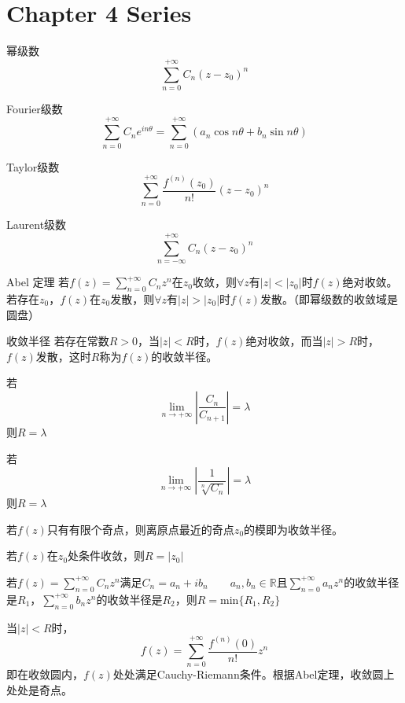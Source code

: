 \section{Chapter 4 Series}
\begin{definition*}{幂级数}
    \[\sum_{n=0}^{+\infty}C_n(z-z_0)^n\]
\end{definition*}
\begin{definition*}{Fourier级数}
    \[\sum_{n=0}^{+\infty}C_ne^{in\theta} = \sum_{n=0}^{+\infty}(a_n\cos n\theta + b_n\sin n\theta)\]
\end{definition*}
\begin{definition*}{Taylor级数}
    \[\sum_{n=0}^{+\infty}\frac{f^{(n)}(z_0)}{n!}(z-z_0)^n\]
\end{definition*}
\begin{definition*}{Laurent级数}
    \[\sum_{n=-\infty}^{+\infty}C_n(z-z_0)^n\]
\end{definition*}
\begin{theorem*}{Abel 定理}
    若$f(z)=\sum_{n=0}^{+\infty}C_nz^n$在$z_0$收敛，则$\forall z$有$|z|<|z_0|$时$f(z)$绝对收敛。
    若存在$z_0$，$f(z)$在$z_0$发散，则$\forall z$有$|z|>|z_0|$时$f(z)$发散。（即幂级数的收敛域是圆盘）
\end{theorem*}
\begin{definition*}{收敛半径}
    若存在常数$R>0$，当$|z|<R$时，$f(z)$绝对收敛，而当$|z|>R$时，$f(z)$发散，这时$R$称为$f(z)$的收敛半径。
\end{definition*}
\begin{theorem*}
    若\[\lim_{n\rightarrow+\infty}\left|\frac{C_n}{C_{n+1}}\right|=\lambda\]
    则$R=\lambda$
\end{theorem*}
\begin{theorem*}
    若\[\lim_{n\rightarrow+\infty} \left|\frac{1}{\sqrt[n]{C_n}}\right|=\lambda\]
    则$R=\lambda$
\end{theorem*}
\begin{theorem*}
    若$f(z)$只有有限个奇点，则离原点最近的奇点$z_0$的模即为收敛半径。
\end{theorem*}
\begin{theorem*}
    若$f(z)$在$z_0$处条件收敛，则$R=|z_0|$
\end{theorem*}
\begin{theorem*}
    若$f(z)=\sum_{n=0}^{+\infty}C_nz^n$满足$C_n = a_n + ib_n\qquad a_n,b_n\in\mathbb{R}$且$\sum_{n=0}^{+\infty}a_nz^n$的收敛半径是$R_1$，$\sum_{n=0}^{+\infty}b_nz^n$的收敛半径是$R_2$，则$R=\mathrm{min}\{R_1,R_2\}$
\end{theorem*}
\begin{theorem*}
当$|z|<R$时，\[f(z)=\sum_{n=0}^{+\infty}\frac{f^{(n)}(0)}{n!}z^n\]
即在收敛圆内，$f(z)$处处满足Cauchy-Riemann条件。根据Abel定理，收敛圆上处处是奇点。
\end{theorem*}
